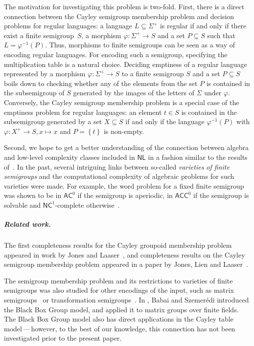 \documentclass[11pt]{article}
\numberwithin{equation}{section}
\theoremstyle{definition}
\theoremstyle{plain}
\newcommand{\os}[1]{\ensuremath{\left\{#1\right\}}}
\newcommand{\AC}{\ensuremath{\mathsf{AC}}}
\newcommand{\ACC}{\ensuremath{\mathsf{ACC}}}
\newcommand{\NC}{\ensuremath{\mathsf{NC}}}
\newcommand{\NL}{\ensuremath{\mathsf{NL}}}
\newcommand{\SCGM}{Cayley groupoid membership}
\newcommand{\SCSM}{Cayley semigroup membership}
\newcommand{\SCGMP}{{\SCGM} problem}
\newcommand{\SCSMP}{{\SCSM} problem}
\begin{document}
The motivation for investigating this problem is two-fold.
%
%
First,   %
there is a direct connection between the {\SCSMP} and decision
problems for regular languages: a language $L \subseteq \Sigma^+$ is regular
if and only if there exist a finite semigroup~$S$, a morphism $\varphi \colon
\Sigma^+ \to S$ and a set $P \subseteq S$ such that $L = \varphi^{-1}(P)$.
%
Thus, morphisms to finite semigroups can be seen as a way of encoding regular
languages. For encoding such a semigroup, specifying the multiplication table
is a natural choice.
%
Deciding emptiness of a regular language represented by a morphism $\varphi
\colon \Sigma^+ \to S$ to a finite semigroup $S$ and a set $P \subseteq S$
boils down to checking whether any of the elements from the set $P$ is
contained in the subsemigroup of $S$ generated by the images of the letters of
$\Sigma$ under $\varphi$.
%
Conversely, the {\SCSMP} is a special case of the emptiness problem for regular
languages: an element $t \in S$ is contained in the subsemigroup generated by a
set $X \subseteq S$ if and only if the language $\varphi^{-1}(P)$ with $\varphi
\colon X^+ \to S, x \mapsto x$ and $P = \os{t}$ is non-empty.

%
Second,  %
we hope to get a better understanding of the connection between
algebra and low-level complexity classes included in $\NL$ in a fashion 
similar to the results of~\cite{BarringtonM91}.
%
In the past, several intriguing links between so-called \emph{varieties
of finite semigroups} and the computational complexity of algebraic problems
for such varieties were made.
%
For example, the word problem for a fixed finite semigroup was shown to be in
$\AC^0$ if the semigroup is aperiodic, in $\ACC^0$ if the semigroup is solvable
and $\NC^1$-complete otherwise~\cite{Barrington89,bt88jacm}.

\subparagraph{Related work.}

%
The first %
completeness results for the {\SCGMP} appeared in work by Jones and
Laaser~\cite{JonesL76}, and completeness results on the {\SCSMP} appeared in a
paper by Jones, Lien and Laaser~\cite{JonesLL76}.

The semigroup membership problem and its restrictions to varieties of finite
semigroups was also studied for other encodings of the input, such as matrix
semigroups~\cite{Babai85,BabaiS84,BabaiBIL96} or transformation
semigroups~\cite{Sims1967,FurstHopcroftLuks80,BabaiLS87,Beaudry88,BeaudryMT92,Beaudry94,Beaudry88thesis}.
%
In \cite{BabaiS84}, Babai and Szemer\'edi introduced the Black Box Group model,
and applied it to matrix groups over finite fields. The Black Box Group model
also has direct applications in the Cayley table model\,---\,however, to the
best of our knowledge, this connection has not been investigated prior to the
present paper.
\end{document}
